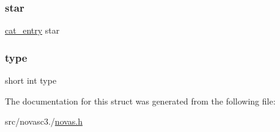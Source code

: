 \mbox{\label{structobject_a0ead8b30742e9c76887f5ff76cabae7c}} 
\subsubsection{\texorpdfstring{star}{star}}
{\footnotesize\ttfamily \mbox{\hyperlink{novas_8h_a262daaa71cede05205cfaa727313c1f3}{cat\+\_\+entry}} star}

\mbox{\label{structobject_aaa8ba4297d83f2cce5af75b18564ae13}} 
\subsubsection{\texorpdfstring{type}{type}}
{\footnotesize\ttfamily short int type}



The documentation for this struct was generated from the following file\+:\begin{DoxyCompactItemize}
\item 
src/novasc3./\mbox{\hyperlink{novas_8h}{novas.\+h}}\end{DoxyCompactItemize}
